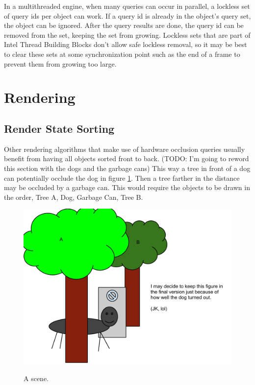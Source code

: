 \documentclass[12pt]{ucthesis}
\newcommand{\captionfonts}{\small\bf\ssp}
\begin{document}
In a multithreaded engine, when many queries can occur in parallel, a lockless set of query ids per object can work.
If a query id is already in the object's query set, the object can be ignored.
After the query results are done, the query id can be removed from the set, keeping the set from growing.
Lockless sets that are part of Intel Thread Building Blocks don't allow safe lockless removal, so it may be best to clear these sets at some synchronization point such as the end of a frame to prevent them from growing too large.\cite{tbb}

\section{Rendering}
\label{rendering}

\subsection{Render State Sorting}
\label {render-state-sorting}
Other rendering algorithms that make use of hardware occlusion queries usually benefit from having all objects sorted front to back.
(TODO: I'm going to reword this section with the dogs and the garbage cans)
This way a tree in front of a dog can potentially occlude the dog in figure \ref{fig:a-scene}.
Then a tree farther in the distance may be occluded by a garbage can.
This would require the objects to be drawn in the order, Tree A, Dog, Garbage Can, Tree B.

\begin{figure}
\begin{center}
\includegraphics[width=\textwidth]{Images/sample-scene.pdf}
\captionfonts
\caption[A scene]{A scene.}
\label{fig:a-scene}
\end{center}
\end{figure}
\end{document}
